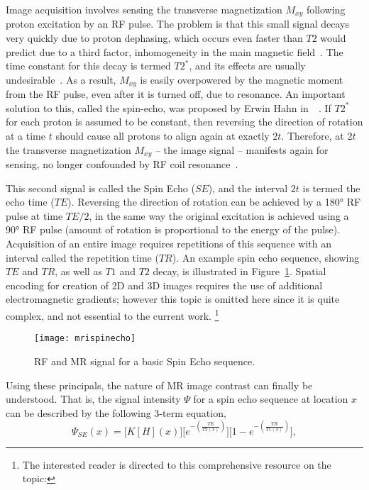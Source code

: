 Image acquisition involves sensing the transverse magnetization $M_{xy}$
following proton excitation by an RF pulse.
The problem is that this small signal decays very quickly due to proton dephasing,
which occurs even faster than $T2$ would predict due to a third factor,
inhomogeneity in the main magnetic field~\cite{Chavhan2009}.
The time constant for this decay is termed $T2^*$,
and its effects are usually undesirable~\cite{Chavhan2009}.
As a result, $M_{xy}$ is easily overpowered by the magnetic moment from the RF pulse,
even after it is turned off, due to resonance.
An important solution to this, called the spin-echo,
was proposed by Erwin Hahn in~\citeyear{Hahn1950}~\cite{Hahn1950}.
If $T2^*$ for each proton is assumed to be constant, then reversing the direction of rotation
at a time $t$ should cause all protons to align again at exactly $2t$.
Therefore, at $2t$ the transverse magnetization $M_{xy}$ -- the image signal --
manifests again for sensing, no longer confounded by RF coil resonance~\cite{Hahn1950}.
\par
This second signal is called the Spin Echo ($SE$),
and the interval $2t$ is termed the echo time ($TE$).
Reversing the direction of rotation can be achieved by a \ang{180} RF pulse
at time $TE/2$, in the same way the original excitation is achieved using a \ang{90}
RF pulse (amount of rotation is proportional to the energy of the pulse).
Acquisition of an entire image requires repetitions of this sequence with an interval
called the repetition time ($TR$).
An example spin echo sequence, showing $TE$ and $TR$, as well as $T1$ and $T2$ decay,
is illustrated in Figure~\ref{fig:mrispinecho}.
Spatial encoding for creation of 2D and 3D images
requires the use of additional electromagnetic gradients;
however this topic is omitted here since it is quite complex, and not essential to the current work.%
\footnote{The interested reader is directed to this comprehensive resource on the topic:
  }
\par
\begin{figure}
  \centering\texttt{[image: mrispinecho]}
  \caption{RF and MR signal for a basic Spin Echo sequence.}%
  \label{fig:mrispinecho}
\end{figure}
Using these principals, the nature of MR image contrast can finally be understood.
That is, the signal intensity $\Psi$ for a spin echo sequence at location $x$
can be described by the following 3-term equation,
\begin{equation}\label{eq:MRI-SE}
  \Psi_{SE}(x) = \bigg[K [H](x)\bigg]
    \bigg[e^{-\left(\frac{TE}{T2(x)}\right)}\bigg]
    \bigg[1 - e^{-\left(\frac{TR}{T1(x)}\right)}\bigg],
\end{equation}
